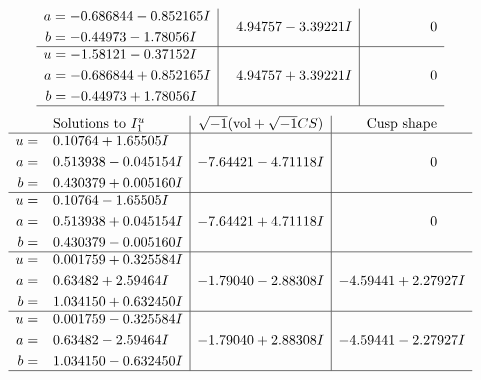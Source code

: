 \documentclass[1p]{elsarticle_modified}
\theoremstyle{definition}
\newcommand{\I}{\sqrt{-1}}
\begin{document}
$$\begin{array}{c|c|c}
\begin{aligned}
a &= -0.686844 - 0.852165 I \\
b &= -0.44973 - 1.78056 I\end{aligned}
 & \phantom{-}4.94757 - 3.39221 I & \phantom{-0.000000 } 0 \\ \hline\begin{aligned}
u &= -1.58121 - 0.37152 I \\
a &= -0.686844 + 0.852165 I \\
b &= -0.44973 + 1.78056 I\end{aligned}
 & \phantom{-}4.94757 + 3.39221 I & \phantom{-0.000000 } 0\\
 \hline 
 \end{array}$$\newpage$$\begin{array}{c|c|c}  
\text{Solutions to }I^u_{1}& \I (\text{vol} + \sqrt{-1}CS) & \text{Cusp shape}\\
 \hline 
\begin{aligned}
u &= \phantom{-}0.10764 + 1.65505 I \\
a &= \phantom{-}0.513938 - 0.045154 I \\
b &= \phantom{-}0.430379 + 0.005160 I\end{aligned}
 & -7.64421 - 4.71118 I & \phantom{-0.000000 } 0 \\ \hline\begin{aligned}
u &= \phantom{-}0.10764 - 1.65505 I \\
a &= \phantom{-}0.513938 + 0.045154 I \\
b &= \phantom{-}0.430379 - 0.005160 I\end{aligned}
 & -7.64421 + 4.71118 I & \phantom{-0.000000 } 0 \\ \hline\begin{aligned}
u &= \phantom{-}0.001759 + 0.325584 I \\
a &= \phantom{-}0.63482 + 2.59464 I \\
b &= \phantom{-}1.034150 + 0.632450 I\end{aligned}
 & -1.79040 - 2.88308 I & -4.59441 + 2.27927 I \\ \hline\begin{aligned}
u &= \phantom{-}0.001759 - 0.325584 I \\
a &= \phantom{-}0.63482 - 2.59464 I \\
b &= \phantom{-}1.034150 - 0.632450 I\end{aligned}
 & -1.79040 + 2.88308 I & -4.59441 - 2.27927 I\\
 \hline 
 \end{array}$$\newpage\newpage\renewcommand{\arraystretch}{1}
\end{document}
